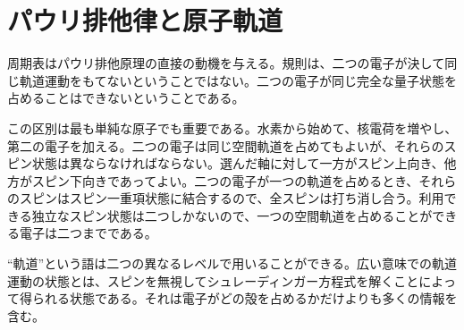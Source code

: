 \begin{classroomqa}
\end{classroomqa}

\section{パウリ排他律と原子軌道}

周期表はパウリ排他原理の直接の動機を与える。規則は、二つの電子が決して同じ軌道運動をもてないということではない。二つの電子が同じ完全な量子状態を占めることはできないということである。

この区別は最も単純な原子でも重要である。水素から始めて、核電荷を増やし、第二の電子を加える。二つの電子は同じ空間軌道を占めてもよいが、それらのスピン状態は異ならなければならない。選んだ軸に対して一方がスピン上向き、他方がスピン下向きであってよい。二つの電子が一つの軌道を占めるとき、それらのスピンはスピン一重項状態に結合するので、全スピンは打ち消し合う。利用できる独立なスピン状態は二つしかないので、一つの空間軌道を占めることができる電子は二つまでである。

\begin{classroomqa}
\end{classroomqa}

``軌道''という語は二つの異なるレベルで用いることができる。広い意味での軌道運動の状態とは、スピンを無視してシュレーディンガー方程式を解くことによって得られる状態である。それは電子がどの殻を占めるかだけよりも多くの情報を含む。

\begin{classroomqa}
\end{classroomqa}

